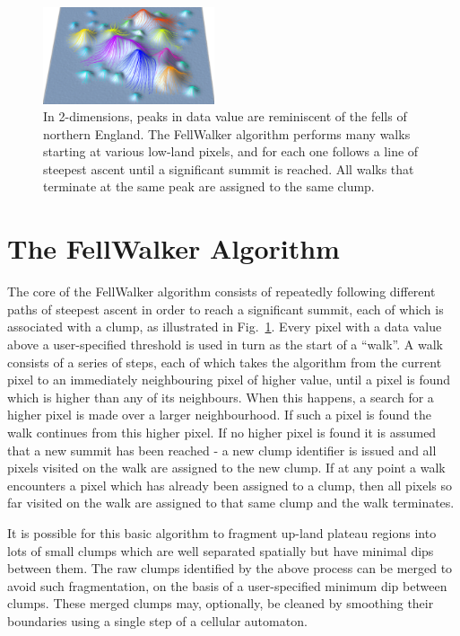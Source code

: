 \documentclass[final,authoryear,5p,times,twocolumn]{elsarticle}
\begin{document}
\begin{figure}
\includegraphics[width=0.45\textwidth]{fellwalking.png}
\caption{In 2-dimensions, peaks in data value are reminiscent of the
fells of northern England. The FellWalker algorithm performs many walks
starting at various low-land pixels, and for each one follows a line of steepest ascent
until a significant summit is reached. All walks that terminate at the
same peak are assigned to the same clump.}
\label{fig:fellwalking}
\end{figure}

\section{The FellWalker Algorithm}

The core of the FellWalker algorithm consists of repeatedly following
different paths of steepest ascent in order to reach a significant
summit, each of which is associated with a clump, as illustrated in
Fig.~\ref{fig:fellwalking}. Every pixel with a data value above a
user-specified threshold is used in turn as the start of a ``walk''. A
walk consists of a series of steps, each of which takes the algorithm
from the current pixel to an immediately neighbouring pixel of higher
value, until a pixel is found which is higher than any of its neighbours.
When this happens, a search for a higher pixel is made over a larger
neighbourhood. If such a pixel is found the walk continues from this
higher pixel. If no higher pixel is found it is assumed that a new summit
has been reached - a new clump identifier is issued and all pixels
visited on the walk are assigned to the new clump. If at any point a walk
encounters a pixel which has already been assigned to a clump, then all
pixels so far visited on the walk are assigned to that same clump and the
walk terminates.

It is possible for this basic algorithm to fragment up-land plateau
regions into lots of small clumps which are well separated spatially but
have minimal dips between them. The raw clumps identified by the above
process can be merged to avoid such fragmentation, on the basis of a
user-specified minimum dip between clumps. These merged clumps may,
optionally, be cleaned by smoothing their boundaries using a single step
of a cellular automaton.
\end{document}
